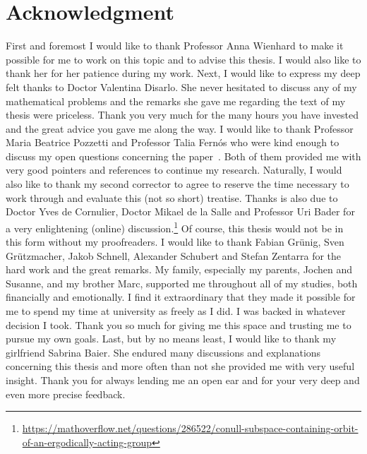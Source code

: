 \clearpage
{}
\markleft{}
\pagestyle{useheadings}
\section*{Acknowledgment}
%
\label{sec:acknowledgement}

First and foremost I would like to thank Professor Anna Wienhard to make it possible for me to work on this topic and to advise this thesis. I would also like to thank her for her patience during my work. Next, I would like to express my deep felt thanks to Doctor Valentina Disarlo. She never hesitated to discuss any of my mathematical problems and the remarks she gave me regarding the text of my thesis were priceless. Thank you very much for the many hours you have invested and the great advice you gave me along the way.
I would like to thank Professor Maria Beatrice Pozzetti and Professor Talia Fernós who were kind enough to discuss my open questions concerning the paper~\cite{MR3509968}. Both of them provided me with very good pointers and references to continue my research. Naturally, I would also like to thank my second corrector to agree to reserve the time necessary to work through and evaluate this (not so short) treatise.
Thanks is also due to Doctor Yves de Cornulier, Doctor Mikael de la Salle and Professor Uri Bader for a very enlightening (online) discussion.\footnote{\url{https://mathoverflow.net/questions/286522/conull-subspace-containing-orbit-of-an-ergodically-acting-group}} 
Of course, this thesis would not be in this form without my proofreaders. I would like to thank Fabian Grünig, Sven Grützmacher, Jakob Schnell, Alexander Schubert and Stefan Zentarra for the hard work and the great remarks.
My family, especially my parents, Jochen and Susanne, and my brother Marc, supported me throughout all of my studies, both financially and emotionally. I find it extraordinary that they made it possible for me to spend my time at university as freely as I did. I was backed in whatever decision I took. Thank you so much for giving me this space and trusting me to pursue my own goals.
Last, but by no means least, I would like to thank my girlfriend Sabrina Baier. She endured many discussions and explanations concerning this thesis and more often than not she provided me with very useful insight. Thank you for always lending me an open ear and for your very deep and even more precise feedback.

\clearpage
\pagestyle{useheadings}

